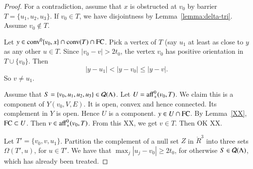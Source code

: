 \begin{proof} For a contradiction, assume that $x$ is obstructed
at $v_0$ by barrier $T =\{u_1,u_2,u_3\}$.
If $v_0\in T$, we have disjointness by Lemma~\ref{lemma:delta-tri}. Assume $v_0\not\in T$.



Let $y\in {\operatorname{conv}}^0\{v_0,x\}\cap {\operatorname{conv}}(T)\cap {\operatorname{FC}}$.  Pick
a vertex of $T$ (say $u_1$ at least as close to $y$ as any other
$u\in T$.  Since $|v_0-v|>2t_0$, the vertex $v_0$ has positive
orientation in $T\cup\{v_0\}$.  Then
  $$
  |y - u_1| < |y - v_0| \le |y - v|.
  $$
So $v\ne u_1$.



Assume that $S=\{v_0,u_1,u_2,u_3\}\in{\mathcal Q}(\Lambda)$.  Let 
$U={\operatorname{aff}}_+^0(v_0,T)$.  We claim this is a component of
$Y(v_0,V,E)$.  It is open, convex and hence connected.  Its
complement in $Y$ is open.  Hence $U$ is a component.
$y\in U\cap {\operatorname{FC}}$.  By Lemma~\ref{XX}, ${\operatorname{FC}}\subset U$.  Then
$v\in {\operatorname{aff}}_+^0(v_0,T)$.  From this XX, we get $v\in T$.
Then OK XX.

Let $T'= \{v_0,v,u_1\}$.
Partition the complement of a null set $Z$ in $\ring{R}^3$ 
into three sets $\Omega(T',u)$, for $u\in T'$.
We have  that $\max_j |u_j-v_0| \ge 2t_0$, for otherwise
$S\in{\mathcal Q}(\Lambda)$, which has already been treated. 


\end{proof}
